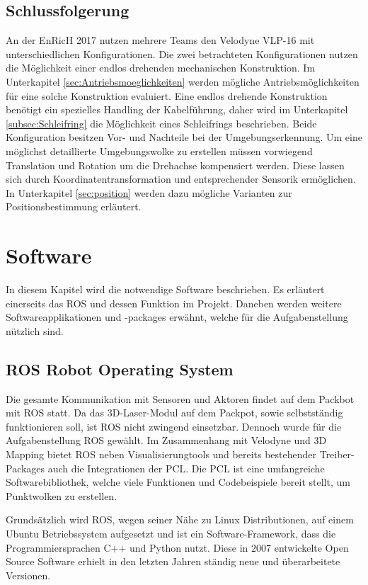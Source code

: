 \subsection{Schlussfolgerung}
An der \ac{EnRicH} 2017 nutzen mehrere Teams den Velodyne VLP-16 mit unterschiedlichen Konfigurationen. Die zwei betrachteten Konfigurationen nutzen die Möglichkeit einer endlos drehenden mechanischen Konstruktion. Im Unterkapitel \ref{sec:Antriebsmoeglichkeiten} werden mögliche Antriebsmöglichkeiten für eine solche Konstruktion evaluiert. Eine endlos drehende Konstruktion benötigt ein spezielles Handling der Kabelführung, daher wird im Unterkapitel \ref{subsec:Schleifring} die Möglichkeit eines Schleifrings beschrieben. Beide Konfiguration besitzen Vor- und Nachteile bei der Umgebungserkennung. Um eine möglichst detaillierte Umgebungswolke zu erstellen müssen vorwiegend Translation und Rotation um die Drehachse kompensiert werden. Diese lassen sich durch Koordinatentransformation und entsprechender Sensorik ermöglichen. In Unterkapitel \ref{sec:position} werden dazu mögliche Varianten zur Positionsbestimmung erläutert.
  
\section{Software}
\label{sec:Software}
In diesem Kapitel wird die notwendige Software beschrieben. Es erläutert einerseits das \ac{ROS} und dessen Funktion im Projekt. Daneben werden weitere Softwareapplikationen und -packages erwähnt, welche für die Aufgabenstellung nützlich sind.

\subsection{ROS Robot Operating System}
\label{subsec:ROS}
Die gesamte Kommunikation mit Sensoren und Aktoren findet auf dem Packbot mit \ac{ROS} statt. Da das 3D-Laser-Modul auf dem Packpot, sowie selbstständig funktionieren soll, ist ROS nicht zwingend einsetzbar. Dennoch wurde für die Aufgabenstellung ROS gewählt. Im Zusammenhang mit Velodyne und 3D Mapping bietet ROS neben Visualisierungtools und bereits bestehender Treiber-Packages auch die Integrationen der \ac{PCL}. Die \ac{PCL} ist eine umfangreiche Softwarebibliothek, welche viele Funktionen und Codebeispiele bereit stellt, um Punktwolken zu erstellen.

Grundsätzlich wird \ac{ROS}, wegen seiner Nähe zu Linux Distributionen, auf einem Ubuntu Betriebssystem aufgesetzt und ist ein Software-Framework, dass die Programmiersprachen C++ und Python nutzt. Diese in 2007 entwickelte Open Source Software erhielt in den letzten Jahren ständig neue und überarbeitete Versionen.

